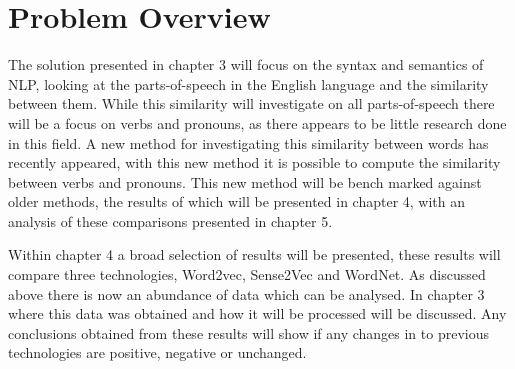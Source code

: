 \section{Problem Overview}
The solution presented in chapter 3 will focus on the syntax and semantics of NLP, looking at the parts-of-speech in the English language and the similarity between them. While this similarity will investigate on all parts-of-speech there will be a focus on verbs and pronouns, as there appears to be little research done in this field. A new method for investigating this similarity between words has recently appeared, with this new method it is possible to compute the similarity between verbs and pronouns. This new method will be bench marked against older methods, the results of which will be presented in chapter 4, with an analysis of these comparisons presented in chapter 5.

Within chapter 4 a broad selection of results will be presented, these results will compare three technologies, Word2vec, Sense2Vec and WordNet. As discussed above there is now an abundance of data which can be analysed. In chapter 3 where this data was obtained and how it will be processed will be discussed. Any conclusions obtained from these results will show if any changes in to previous technologies are positive, negative or unchanged.